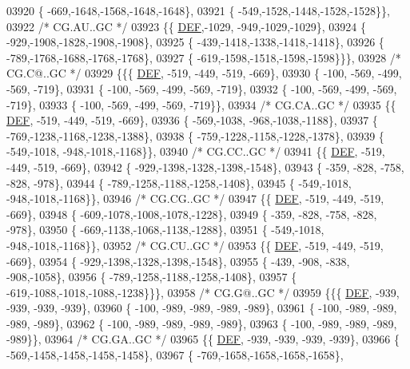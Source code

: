 \begin{DoxyCode}
03920 \{ -669,-1648,-1568,-1648,-1648\},
03921 \{ -549,-1528,-1448,-1528,-1528\}\},
03922 \textcolor{comment}{/* CG.AU..GC */}
03923 \{\{  \mbox{\hyperlink{1_88_84__epars_8h_a397419fc12b37ed479c8abb9d444d843}{DEF}},-1029, -949,-1029,-1029\},
03924 \{ -929,-1908,-1828,-1908,-1908\},
03925 \{ -439,-1418,-1338,-1418,-1418\},
03926 \{ -789,-1768,-1688,-1768,-1768\},
03927 \{ -619,-1598,-1518,-1598,-1598\}\}\},
03928 \textcolor{comment}{/* CG.C@..GC */}
03929 \{\{\{  \mbox{\hyperlink{1_88_84__epars_8h_a397419fc12b37ed479c8abb9d444d843}{DEF}}, -519, -449, -519, -669\},
03930 \{ -100, -569, -499, -569, -719\},
03931 \{ -100, -569, -499, -569, -719\},
03932 \{ -100, -569, -499, -569, -719\},
03933 \{ -100, -569, -499, -569, -719\}\},
03934 \textcolor{comment}{/* CG.CA..GC */}
03935 \{\{  \mbox{\hyperlink{1_88_84__epars_8h_a397419fc12b37ed479c8abb9d444d843}{DEF}}, -519, -449, -519, -669\},
03936 \{ -569,-1038, -968,-1038,-1188\},
03937 \{ -769,-1238,-1168,-1238,-1388\},
03938 \{ -759,-1228,-1158,-1228,-1378\},
03939 \{ -549,-1018, -948,-1018,-1168\}\},
03940 \textcolor{comment}{/* CG.CC..GC */}
03941 \{\{  \mbox{\hyperlink{1_88_84__epars_8h_a397419fc12b37ed479c8abb9d444d843}{DEF}}, -519, -449, -519, -669\},
03942 \{ -929,-1398,-1328,-1398,-1548\},
03943 \{ -359, -828, -758, -828, -978\},
03944 \{ -789,-1258,-1188,-1258,-1408\},
03945 \{ -549,-1018, -948,-1018,-1168\}\},
03946 \textcolor{comment}{/* CG.CG..GC */}
03947 \{\{  \mbox{\hyperlink{1_88_84__epars_8h_a397419fc12b37ed479c8abb9d444d843}{DEF}}, -519, -449, -519, -669\},
03948 \{ -609,-1078,-1008,-1078,-1228\},
03949 \{ -359, -828, -758, -828, -978\},
03950 \{ -669,-1138,-1068,-1138,-1288\},
03951 \{ -549,-1018, -948,-1018,-1168\}\},
03952 \textcolor{comment}{/* CG.CU..GC */}
03953 \{\{  \mbox{\hyperlink{1_88_84__epars_8h_a397419fc12b37ed479c8abb9d444d843}{DEF}}, -519, -449, -519, -669\},
03954 \{ -929,-1398,-1328,-1398,-1548\},
03955 \{ -439, -908, -838, -908,-1058\},
03956 \{ -789,-1258,-1188,-1258,-1408\},
03957 \{ -619,-1088,-1018,-1088,-1238\}\}\},
03958 \textcolor{comment}{/* CG.G@..GC */}
03959 \{\{\{  \mbox{\hyperlink{1_88_84__epars_8h_a397419fc12b37ed479c8abb9d444d843}{DEF}}, -939, -939, -939, -939\},
03960 \{ -100, -989, -989, -989, -989\},
03961 \{ -100, -989, -989, -989, -989\},
03962 \{ -100, -989, -989, -989, -989\},
03963 \{ -100, -989, -989, -989, -989\}\},
03964 \textcolor{comment}{/* CG.GA..GC */}
03965 \{\{  \mbox{\hyperlink{1_88_84__epars_8h_a397419fc12b37ed479c8abb9d444d843}{DEF}}, -939, -939, -939, -939\},
03966 \{ -569,-1458,-1458,-1458,-1458\},
03967 \{ -769,-1658,-1658,-1658,-1658\},

\end{DoxyCode}
